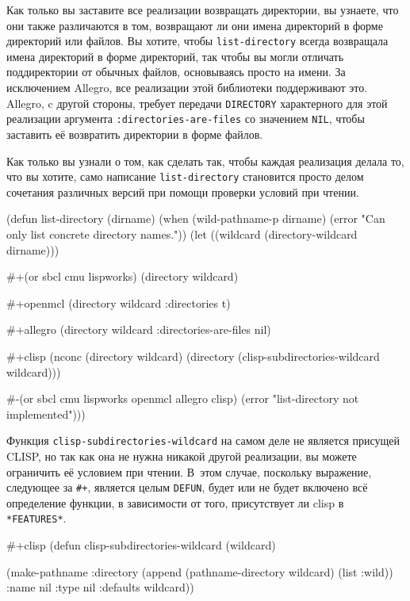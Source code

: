 Как только вы заставите все реализации возвращать директории, вы узнаете, что они также
различаются в том, возвращают ли они имена директорий в форме директорий или файлов. Вы
хотите, чтобы \lstinline{list-directory} всегда возвращала имена директорий в форме директорий,
так чтобы вы могли отличать поддиректории от обычных файлов, основываясь просто на
имени. За исключением Allegro, все реализации этой библиотеки поддерживают это.  Allegro,
c другой стороны, требует передачи \lstinline{DIRECTORY} характерного для этой реализации
аргумента \lstinline{:directories-are-files} со значением \lstinline{NIL}, чтобы заставить её
возвратить директории в форме файлов.

Как только вы узнали о том, как сделать так, чтобы каждая реализация делала то, что вы
хотите, само написание \lstinline{list-directory} становится просто делом сочетания различных
версий при помощи проверки условий при чтении.

\begin{myverb}
(defun list-directory (dirname)
  (when (wild-pathname-p dirname)
    (error "Can only list concrete directory names."))
  (let ((wildcard (directory-wildcard dirname)))

    #+(or sbcl cmu lispworks)
    (directory wildcard)

    #+openmcl
    (directory wildcard :directories t)

    #+allegro
    (directory wildcard :directories-are-files nil)

    #+clisp
    (nconc
     (directory wildcard)
     (directory (clisp-subdirectories-wildcard wildcard)))

    #-(or sbcl cmu lispworks openmcl allegro clisp)
    (error "list-directory not implemented")))
\end{myverb}

Функция \lstinline{clisp-subdirectories-wildcard} на самом деле не является присущей CLISP, но
так как она не нужна никакой другой реализации, вы можете ограничить её условием при
чтении. В~этом случае, поскольку выражение, следующее за \lstinline!#+!, является целым
\lstinline{DEFUN}, будет или не будет включено всё определение функции, в зависимости от того,
присутствует ли clisp в \lstinline{*FEATURES*}.

\begin{myverb}
#+clisp
(defun clisp-subdirectories-wildcard (wildcard)

  (make-pathname
   :directory (append (pathname-directory wildcard) (list :wild))
   :name nil
   :type nil
   :defaults wildcard))
\end{myverb}

